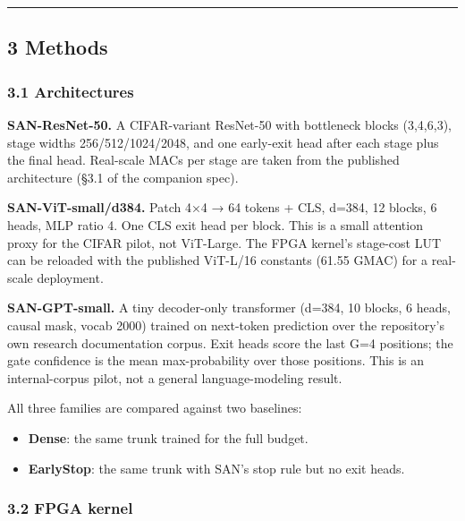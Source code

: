 \documentclass[
]{article}
\providecommand{\tightlist}{%
  \setlength{\itemsep}{0pt}\setlength{\parskip}{0pt}}
\begin{document}
\begin{center}\rule{0.5\linewidth}{0.5pt}\end{center}

\hypertarget{methods}{%
\subsection{3 Methods}\label{methods}}

\hypertarget{architectures}{%
\subsubsection{3.1 Architectures}\label{architectures}}

\textbf{SAN-ResNet-50.} A CIFAR-variant ResNet-50 with bottleneck blocks
(3,4,6,3), stage widths 256/512/1024/2048, and one early-exit head after
each stage plus the final head. Real-scale MACs per stage are taken from
the published architecture (§3.1 of the companion spec).

\textbf{SAN-ViT-small/d384.} Patch 4×4 → 64 tokens + CLS, d=384, 12
blocks, 6 heads, MLP ratio 4. One CLS exit head per block. This is a
small attention proxy for the CIFAR pilot, not ViT-Large. The FPGA
kernel's stage-cost LUT can be reloaded with the published ViT-L/16
constants (61.55 GMAC) for a real-scale deployment.

\textbf{SAN-GPT-small.} A tiny decoder-only transformer (d=384, 10
blocks, 6 heads, causal mask, vocab 2000) trained on next-token
prediction over the repository's own research documentation corpus. Exit
heads score the last G=4 positions; the gate confidence is the mean
max-probability over those positions. This is an internal-corpus pilot,
not a general language-modeling result.

All three families are compared against two baselines:

\begin{itemize}
\tightlist
\item
  \textbf{Dense}: the same trunk trained for the full budget.
\item
  \textbf{EarlyStop}: the same trunk with SAN's stop rule but no exit
  heads.
\end{itemize}

\hypertarget{fpga-kernel}{%
\subsubsection{3.2 FPGA kernel}\label{fpga-kernel}}
\end{document}
